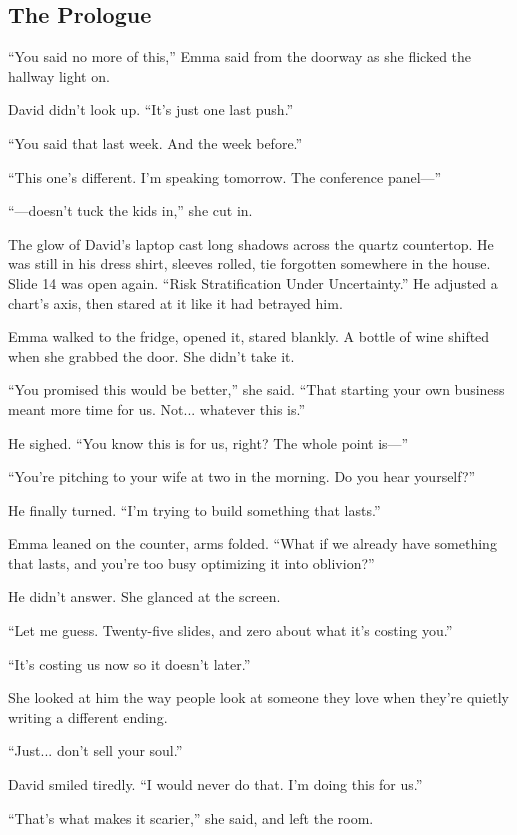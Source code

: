 \subsection{The Prologue}


``You said no more of this,'' Emma said from the doorway as she flicked the hallway light on.

David didn’t look up. ``It’s just one last push.''

``You said that last week. And the week before.''

``This one’s different. I’m speaking tomorrow. The conference panel—''

``—doesn’t tuck the kids in,'' she cut in.

The glow of David’s laptop cast long shadows across the quartz countertop. He was still in his dress shirt, sleeves rolled, 
tie forgotten somewhere in the house. Slide 14 was open again. ``Risk Stratification Under Uncertainty.'' He adjusted a 
chart’s axis, then stared at it like it had betrayed him.

Emma walked to the fridge, opened it, stared blankly. A bottle of wine shifted when she grabbed the door. She didn’t take it.

``You promised this would be better,'' she said. ``That starting your own business meant more time for us. Not... 
whatever this is.''

He sighed. ``You know this is for us, right? The whole point is—''

``You’re pitching to your wife at two in the morning. Do you hear yourself?''

He finally turned. ``I’m trying to build something that lasts.''

Emma leaned on the counter, arms folded. ``What if we already have something that lasts, and you're too busy optimizing 
it into oblivion?''

He didn’t answer. She glanced at the screen.

``Let me guess. Twenty-five slides, and zero about what it’s costing you.''

``It’s costing us now so it doesn’t later.''

She looked at him the way people look at someone they love when they’re quietly writing a different ending.

``Just... don’t sell your soul.''

David smiled tiredly. ``I would never do that. I'm doing this for us.''

``That’s what makes it scarier,'' she said, and left the room.

